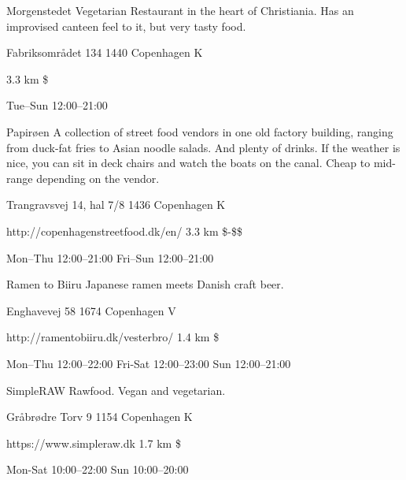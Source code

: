 \begin{left}
\begin{eventitem}
\begin{eventitem}
\begin{eventitem}
\begin{fooditem}
{\begin{ohours}
{}
{}
{}
{}
{}
\end{ohours}}
\end{fooditem}
\begin{fooditemwourl}
{Morgenstedet}
{Vegetarian Restaurant in the heart of Christiania. Has an improvised canteen feel to it, but very tasty food.}
{\begin{addr}
{Fabriksområdet 134}
{1440 Copenhagen K}
\end{addr}}
{3.3 km}
{\$}
{\begin{ohours}
{Tue–Sun}
{12:00–21:00}
{}
{}
{}
{}
{}
{}
\end{ohours}}
\end{fooditemwourl}
\begin{fooditem}
{Papirøen}
{A collection of street food vendors in one old factory building, ranging from duck-fat fries to Asian noodle salads. And plenty of drinks. If the weather is nice, you can sit in deck chairs and watch the boats on the canal. Cheap to mid-range depending on the vendor.}
{\begin{addr}
{Trangravsvej 14, hal 7/8}
{1436 Copenhagen K}
\end{addr}}
{http://copenhagenstreetfood.dk/en/}
{3.3 km}
{\$-\$\$}
{\begin{ohours}
{Mon–Thu}
{12:00–21:00}
{Fri–Sun}
{12:00–21:00}
{}
{}
{}
{}
\end{ohours}}
\end{fooditem}
\begin{fooditem}
{Ramen to Biiru}
{Japanese ramen meets Danish craft beer.}
{\begin{addr}
{Enghavevej 58}
{1674 Copenhagen V}
\end{addr}}
{http://ramentobiiru.dk/vesterbro/}
{1.4 km}
{\$}
{\begin{ohours}
{Mon--Thu}
{12:00–22:00}
{​​Fri-Sat}
{12:00–23:00}
{​Sun}
{12:00–21:00}
{}
{}
\end{ohours}}
\end{fooditem}
\begin{fooditem}
{SimpleRAW}
{Rawfood. Vegan and vegetarian.}
{\begin{addr}
{Gråbrødre Torv 9}
{1154 Copenhagen K}
\end{addr}}
{https://www.simpleraw.dk}
{1.7 km}
{\$}
{\begin{ohours}
{Mon-Sat}
{10:00–22:00}
{Sun}
{10:00–20:00}
{}
{}
{}
{}
\end{ohours}}
\end{fooditem}










\end{eventitem}
\end{eventitem}
\end{eventitem}
\end{left}
